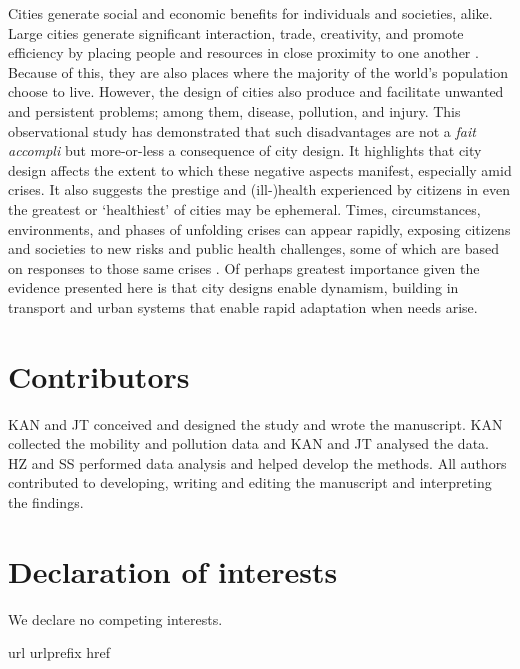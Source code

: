 \documentclass[preprint,10pt]{elsarticle} %
\begin{document}
Cities generate social and economic benefits for individuals and societies, alike. Large cities generate significant interaction, trade, creativity, and promote efficiency by placing people and resources in close proximity to one another \cite{bettencourt2013origins}. Because of this, they are also places where the majority of the world's population choose to live. However, the design of cities also produce and facilitate unwanted and persistent problems; among them, disease, pollution, and injury. This observational study has demonstrated that such disadvantages are not a \textit{fait accompli} but more-or-less a consequence of city design. It highlights that city design affects the extent to which these negative aspects manifest, especially amid crises. It also suggests the prestige and (ill-)health experienced by citizens in even the greatest or `healthiest' of cities may be ephemeral. Times, circumstances, environments, and phases of unfolding crises can appear rapidly, exposing citizens and societies to new risks and public health challenges, some of which are based on responses to those same crises \cite{hunter_city_2024, garcia_city_2024}. Of perhaps greatest importance given the evidence presented here is that city designs enable dynamism, building in transport and urban systems that enable rapid adaptation when needs arise.



\section*{Contributors}\label{sec:credit}
KAN and JT conceived and designed the study and wrote the manuscript. KAN collected the mobility and pollution data and KAN and JT analysed the data. HZ and SS performed data analysis and helped develop the methods. All authors contributed to developing, writing and editing the manuscript and interpreting the findings.

\section*{Declaration of interests}\label{sec:dec}
We declare no competing interests.



 
%
\expandafter\ifx\csname url\endcsname\relax
  \def\url#1{\texttt{#1}}\fi
\expandafter\ifx\csname urlprefix\endcsname\relax\def\urlprefix{URL }\fi
\expandafter\ifx\csname href\endcsname\relax
  \def\href#1#2{#2} \def\path#1{#1}\fi
\end{document}
